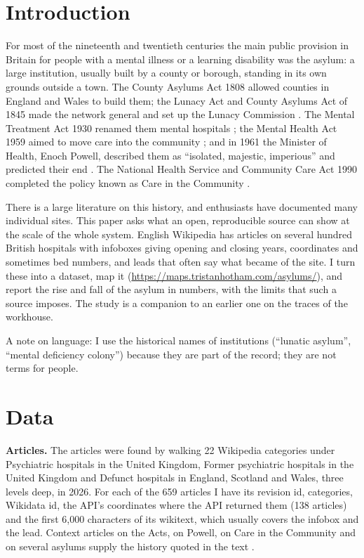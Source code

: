 \documentclass[11pt,a4paper]{article}
\begin{document}
\section{Introduction}
For most of the nineteenth and twentieth centuries the main public provision in Britain for people with a mental illness or a learning disability was the asylum: a large institution, usually built by a county or borough, standing in its own grounds outside a town. The County Asylums Act 1808 allowed counties in England and Wales to build them; the Lunacy Act and County Asylums Act of 1845 made the network general and set up the Lunacy Commission \citep{wiki1808,wiki1845}. The Mental Treatment Act 1930 renamed them mental hospitals \citep{wiki1930}; the Mental Health Act 1959 aimed to move care into the community \citep{wiki1959}; and in 1961 the Minister of Health, Enoch Powell, described them as ``isolated, majestic, imperious'' and predicted their end \citep{wikipowell}. The National Health Service and Community Care Act 1990 completed the policy known as Care in the Community \citep{wikicc}.

There is a large literature on this history, and enthusiasts have documented many individual sites. This paper asks what an open, reproducible source can show at the scale of the whole system. English Wikipedia has articles on several hundred British hospitals with infoboxes giving opening and closing years, coordinates and sometimes bed numbers, and leads that often say what became of the site. I turn these into a dataset, map it (\url{https://maps.tristanhotham.com/asylums/}), and report the rise and fall of the asylum in numbers, with the limits that such a source imposes. The study is a companion to an earlier one on the traces of the workhouse.

A note on language: I use the historical names of institutions (``lunatic asylum'', ``mental deficiency colony'') because they are part of the record; they are not terms for people.

\section{Data}
\textbf{Articles.} The articles were found by walking 22 Wikipedia categories under Psychiatric hospitals in the United Kingdom, Former psychiatric hospitals in the United Kingdom and Defunct hospitals in England, Scotland and Wales, three levels deep, in 2026. For each of the 659 articles I have its revision id, categories, Wikidata id, the API's coordinates where the API returned them (138 articles) and the first 6,000 characters of its wikitext, which usually covers the infobox and the lead. Context articles on the Acts, on Powell, on Care in the Community and on several asylums supply the history quoted in the text \citep{wiki1774,wiki1808,wiki1845,wiki1930,wiki1959,wikipowell,wikicc,wikiepsom,wikiwhit,wikicolney,wikibethlem,wikila}.
\end{document}
